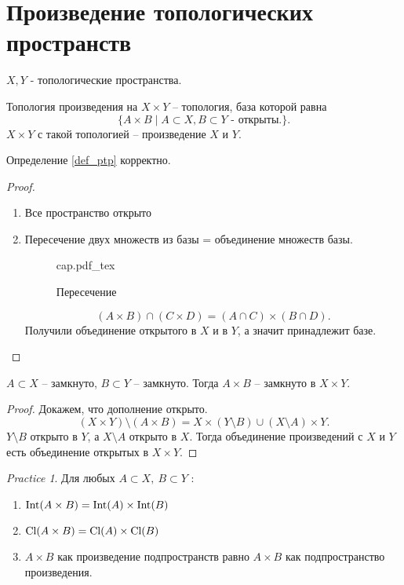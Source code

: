 \documentclass[11pt]{book}
\newcommand{\incfig}[1]{%
    \def\svgwidth{\columnwidth}
    {#1.pdf_tex}
}
\newcommand{\Cl}{{\mathop{\text{\rm Cl}}}}
\newcommand{\Int}{{\mathop{\text{\rm Int}}}}
\theoremstyle{definition}
\theoremstyle{plain}
\theoremstyle{plain}
\theoremstyle{definition}
\theoremstyle{remark}
\newtheorem*{prac}{Practice}
\begin{document}
\section{Произведение топологических пространств}
\begin{defn}\label{def_ptp}
    $X, Y$ - топологические пространства.

    Топология произведения на $X \times Y$ -- топология, база которой равна
    \[
	\{A \times B \mid A \subset X, B \subset Y \mbox{ - открыты.}\}
    .\]
    $X \times Y$ с такой топологией -- произведение $X$ и $Y$.
\end{defn}
\begin{thm}
    Определение \ref{def_ptp} корректно.
\end{thm}
\begin{proof}
    \begin{enumerate}
	\item Все пространство открыто
	\item Пересечение двух множеств из базы = объединение множеств базы.
	    \begin{figure}[ht]
		\centering
		\incfig{cap}
		\caption{Пересечение}
		\label{fig:cap}
	    \end{figure}
	    \[
		(A \times B) \cap (C \times D) = (A \cap C) \times (B \cap D)
	    .\]
	    Получили объединение открытого в $X$ и в $Y$, а значит принадлежит базе.
    \end{enumerate}
\end{proof}
\begin{thm}
    $A \subset X$ -- замкнуто, $B \subset Y$ -- замкнуто. Тогда $A \times B $ -- замкнуто в $X \times Y$.
\end{thm}
\begin{proof}
    Докажем, что дополнение открыто.
    \[
	(X \times Y) \setminus(A \times B) = X \times (Y \setminus B) \cup (X \setminus A) \times Y
    .\]
    $Y \setminus B$ открыто в $Y$, а $X \setminus A$ открыто в $X$. Тогда объединение произведений с $X$ и $Y$ есть объединение открытых в $X \times Y$.
\end{proof}
\begin{prac}
    Для любых $A \subset X, ~ B \subset Y$ :
    \begin{enumerate}
	\item $\Int (A \times B) = \Int(A) \times \Int(B)$
	\item  $\Cl (A \times B) = \Cl(A) \times \Cl(B)$
	\item  $A \times B$  как произведение подпространств равно $A \times B$ как подпространство произведения.
    \end{enumerate}
\end{prac}
\end{document}
